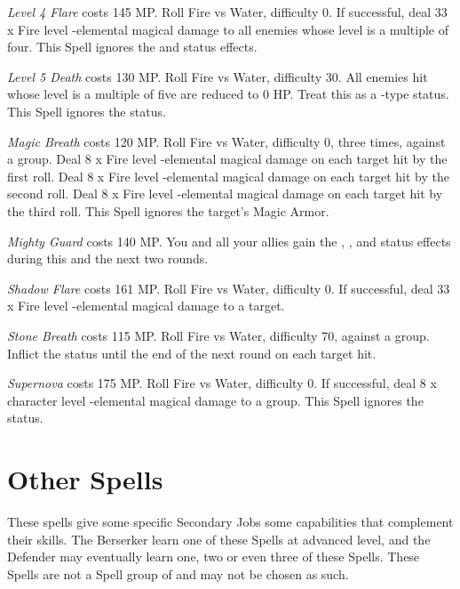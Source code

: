\begin{multicols}{2}
    \textit{Level 4 Flare} costs 145 MP. Roll Fire vs Water, difficulty 0. If successful, deal 33 x Fire level -elemental magical damage to all enemies whose level is a multiple of four. This Spell ignores the  and  status effects.
    
    \textit{Level 5 Death} costs 130 MP. Roll Fire vs Water, difficulty 30. All enemies hit whose level is a multiple of five are reduced to 0 HP. Treat this as a -type status. This Spell ignores the  status.
    
    \textit{Magic Breath} costs 120 MP. Roll Fire vs Water, difficulty 0, three times, against a group. Deal 8 x Fire level -elemental magical damage on each target hit by the first roll. Deal 8 x Fire level -elemental magical damage on each target hit by the second roll. Deal 8 x Fire level -elemental magical damage on each target hit by the third roll. This Spell ignores the target’s Magic Armor.
    
    \textit{Mighty Guard} costs 140 MP. You and all your allies gain the , , and  status effects during this and the next two rounds.
    
    \textit{Shadow Flare} costs 161 MP. Roll Fire vs Water, difficulty 0. If successful, deal 33 x Fire level -elemental magical damage to a target.
    
    \textit{Stone Breath} costs 115 MP. Roll Fire vs Water, difficulty 70, against a group. Inflict the  status until the end of the next round on each target hit.
    
	\textit{Supernova} costs 175 MP. Roll Fire vs Water, difficulty 0. If successful, deal 8 x character level -elemental magical damage to a group. This Spell ignores the  status.

\end{multicols}

    \section{Other Spells}

    These spells give some specific Secondary Jobs some capabilities that complement their skills. The Berserker learn one of these Spells at advanced level, and the Defender may eventually learn one, two or even three of these Spells. These Spells are not a Spell group of and may not be chosen as such.
    
